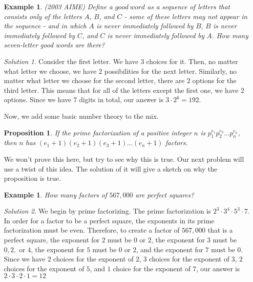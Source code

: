 \documentclass[letterpaper]{article}
\newtheorem{prop}[thm]{Proposition}
\newtheorem{example}[thm]{Example}
\theoremstyle{remark}
\newtheorem*{solution}{Solution}
\theoremstyle{definition}
\begin{document}
\begin{example}
(2003 AIME) Define a $good~word$ as a sequence of letters that consists only of the letters $A$, $B$, and $C$ - some of these letters may not appear in the sequence - and in which $A$ is never immediately followed by $B$, $B$ is never immediately followed by $C$, and $C$ is never immediately followed by $A$. How many seven-letter good words are there?
\end{example}

\begin{solution}
Consider the first letter. We have $3$ choices for it. Then, no matter what letter we choose, we have $2$ possibilities for the next letter. Similarly, no matter what letter we choose for the second letter, there are $2$ options for the third letter. This means that for all of the letters except the first one, we have $2$ options. Since we have $7$ digits in total, our answer is $3\cdot 2^6=192.$
\end{solution}


Now, we add some basic number theory to the mix. 

\begin{prop}
If the prime factorization of a positive integer $n$ is $p_1^{e_1}p_2^{e_2} \dots p_n^{e_n}$, then $n$ has $(e_1+1)(e_2+1)(e_3+1)\dots (e_n+1)$ factors.

\end{prop}

We won't prove this here, but try to see why this is true. Our next problem will use a twist of this idea. The solution of it will give a sketch on why the proposition is true.
\begin{example}
How many factors of $567,000$ are perfect squares?
\end{example}

\begin{solution}
We begin by prime factorizing. The prime factorization is $2^3\cdot 3^4 \cdot 5^3 \cdot 7$. In order for a factor to be a perfect square, the exponents in its prime factorization must be even. Therefore, to create a factor of $567,000$ that is a perfect square, the exponent for $2$ must be $0$ or $2$, the exponent for $3$ must be $0,2,$ or $4$, the exponent for $5$ must be $0$ or $2$, and the exponent for $7$ must be $0$. Since we have $2$ choices for the exponent of $2$, $3$ choices for the exponent of $3$, $2$ choices for the exponent of $5$, and $1$ choice for the exponent of $7$, our answer is $2\cdot 3\cdot 2 \cdot 1=12$
\end{solution}
\end{document}
